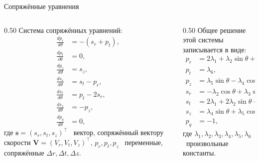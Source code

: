 \documentclass[9pt]{beamer}
\begin{document}
\begin{frame}{Сопряжённые уравнения}
\begin{columns}[T,onlytextwidth]
  \begin{column}{0.50\textwidth}
  Система сопряжённых уравнений:
  \begin{align*}
      \frac{d p_r}{d \theta} &= -(s_r + p_t), \\
      \frac{d p_t}{\partial \theta} &= 0, \\
      \frac{d p_z}{d \theta} &= s_z, \\
      \frac{d s_r}{d \theta} &= s_t - p_r, \\
      \frac{d s_t}{d \theta} &= p_t - 2s_r, \\
      \frac{d s_z}{d \theta} &= -p_z, \\
      \frac{d p_q}{d \theta} &= 0,
  \end{align*}
  где $\mathbf{s} = (s_r, s_t, s_z)^\top$ \textemdash\ вектор, сопряжённый вектору скорости $\mathbf{V} = (V_r, V_t, V_z)^\top$, $p_r, p_t, p_z$ \textemdash\ переменные, сопряжённые $\Delta r, \Delta t, \Delta z$.
  \end{column}

  \begin{column}{0.50\textwidth}
  Общее решение этой системы записывается в виде:
  \begin{align*}
      p_r &= 2 \lambda_1 + \lambda_2 \sin \theta + \lambda_3 \cos \theta - 3 \lambda_6 \theta, \\
      p_t &= \lambda_6, \\
      p_z &= \lambda_5 \sin \theta - \lambda_4 \cos \theta, \\
      s_r &= -\lambda_2 \cos \theta + \lambda_3 \sin \theta + 2 \lambda_6, \\
      s_t &= 2 \lambda_1 + 2 \lambda_2 \sin \theta + 2 \lambda_3 \cos \theta - 3 \lambda_6 \theta, \\
      s_z &= \lambda_4 \sin \theta + \lambda_5 \cos \theta, \\
      p_q &= -1,
  \end{align*}
  где $\lambda_1, \lambda_2, \lambda_3, \lambda_4, \lambda_5, \lambda_6$ \textemdash\ произвольные константы.
  \end{column}
\end{columns}
\end{frame}
\end{document}
